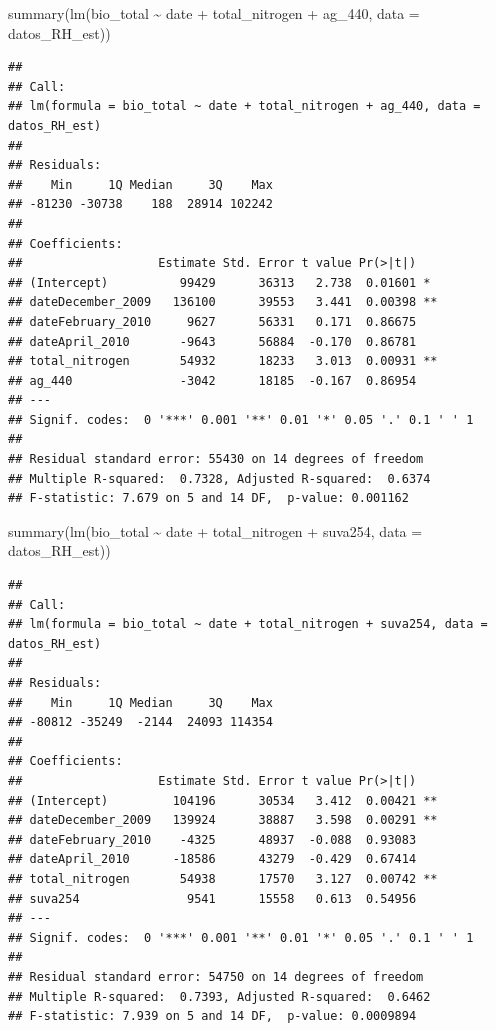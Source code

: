 \documentclass[
]{book}
\newenvironment{Shaded}{\begin{snugshade}}{\end{snugshade}}
\newcommand{\AttributeTok}[1]{\textcolor[rgb]{0.77,0.63,0.00}{#1}}
\newcommand{\FunctionTok}[1]{\textcolor[rgb]{0.00,0.00,0.00}{#1}}
\newcommand{\NormalTok}[1]{#1}
\newcommand{\SpecialCharTok}[1]{\textcolor[rgb]{0.00,0.00,0.00}{#1}}
\begin{document}
\begin{Shaded}
\begin{Highlighting}[]
\FunctionTok{summary}\NormalTok{(}\FunctionTok{lm}\NormalTok{(bio\_total }\SpecialCharTok{\textasciitilde{}}\NormalTok{ date }\SpecialCharTok{+}\NormalTok{ total\_nitrogen }\SpecialCharTok{+}\NormalTok{ ag\_440, }\AttributeTok{data =}\NormalTok{ datos\_RH\_est)) }
\end{Highlighting}
\end{Shaded}

\begin{verbatim}
## 
## Call:
## lm(formula = bio_total ~ date + total_nitrogen + ag_440, data = datos_RH_est)
## 
## Residuals:
##    Min     1Q Median     3Q    Max 
## -81230 -30738    188  28914 102242 
## 
## Coefficients:
##                   Estimate Std. Error t value Pr(>|t|)   
## (Intercept)          99429      36313   2.738  0.01601 * 
## dateDecember_2009   136100      39553   3.441  0.00398 **
## dateFebruary_2010     9627      56331   0.171  0.86675   
## dateApril_2010       -9643      56884  -0.170  0.86781   
## total_nitrogen       54932      18233   3.013  0.00931 **
## ag_440               -3042      18185  -0.167  0.86954   
## ---
## Signif. codes:  0 '***' 0.001 '**' 0.01 '*' 0.05 '.' 0.1 ' ' 1
## 
## Residual standard error: 55430 on 14 degrees of freedom
## Multiple R-squared:  0.7328, Adjusted R-squared:  0.6374 
## F-statistic: 7.679 on 5 and 14 DF,  p-value: 0.001162
\end{verbatim}

\begin{Shaded}
\begin{Highlighting}[]
\FunctionTok{summary}\NormalTok{(}\FunctionTok{lm}\NormalTok{(bio\_total }\SpecialCharTok{\textasciitilde{}}\NormalTok{ date }\SpecialCharTok{+}\NormalTok{ total\_nitrogen }\SpecialCharTok{+}\NormalTok{ suva254, }\AttributeTok{data =}\NormalTok{ datos\_RH\_est)) }
\end{Highlighting}
\end{Shaded}

\begin{verbatim}
## 
## Call:
## lm(formula = bio_total ~ date + total_nitrogen + suva254, data = datos_RH_est)
## 
## Residuals:
##    Min     1Q Median     3Q    Max 
## -80812 -35249  -2144  24093 114354 
## 
## Coefficients:
##                   Estimate Std. Error t value Pr(>|t|)   
## (Intercept)         104196      30534   3.412  0.00421 **
## dateDecember_2009   139924      38887   3.598  0.00291 **
## dateFebruary_2010    -4325      48937  -0.088  0.93083   
## dateApril_2010      -18586      43279  -0.429  0.67414   
## total_nitrogen       54938      17570   3.127  0.00742 **
## suva254               9541      15558   0.613  0.54956   
## ---
## Signif. codes:  0 '***' 0.001 '**' 0.01 '*' 0.05 '.' 0.1 ' ' 1
## 
## Residual standard error: 54750 on 14 degrees of freedom
## Multiple R-squared:  0.7393, Adjusted R-squared:  0.6462 
## F-statistic: 7.939 on 5 and 14 DF,  p-value: 0.0009894
\end{verbatim}
\end{document}
